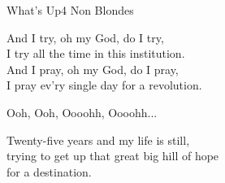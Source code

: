 \begin{song}{What's Up}{4 Non Blondes}
\begin{guitar}
And I try, oh my God, do I try,\\
I try all the time in this institution.\\
And I pray, oh my God, do I pray,\\
I pray ev'ry single day for a revolution.\\
\end{guitar}


\begin{guitar}
Ooh, Ooh, Oooohh, Oooohh...\\
\end{guitar}

\begin{guitar}
Twenty-five years and my life is still,\\
trying to get up that great big hill of hope\\
for a destination.\\
\end{guitar}

\end{song}
